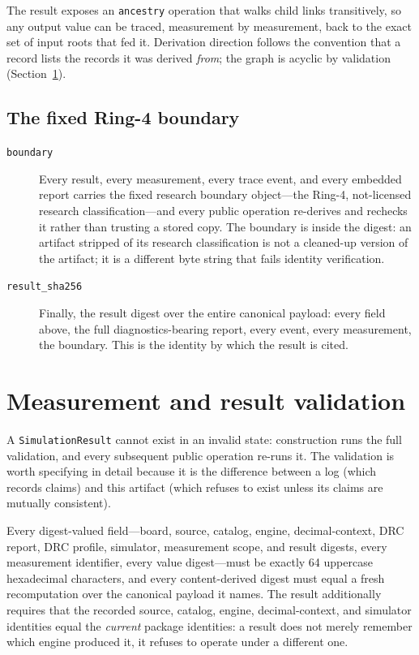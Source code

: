 The result exposes an \texttt{ancestry} operation that walks child links transitively, so any output value can be traced, measurement by measurement, back to the exact set of input roots that fed it. Derivation direction follows the convention that a record lists the records it was derived \emph{from}; the graph is acyclic by validation (Section~\ref{ch08:sec:validation}).

\subsection{The fixed Ring-4 boundary}

\begin{description}
\item[\texttt{boundary}] Every result, every measurement, every trace event, and every embedded report carries the fixed research boundary object---the Ring-4, not-licensed research classification---and every public operation re-derives and rechecks it rather than trusting a stored copy. The boundary is inside the digest: an artifact stripped of its research classification is not a cleaned-up version of the artifact; it is a different byte string that fails identity verification.
\item[\texttt{result\_sha256}] Finally, the result digest over the entire canonical payload: every field above, the full diagnostics-bearing report, every event, every measurement, the boundary. This is the identity by which the result is cited.
\end{description}

\section{Measurement and result validation}\label{ch08:sec:validation}

A \texttt{SimulationResult} cannot exist in an invalid state: construction runs the full validation, and every subsequent public operation re-runs it. The validation is worth specifying in detail because it is the difference between a log (which records claims) and this artifact (which refuses to exist unless its claims are mutually consistent).

\begin{invariant}\label{ch08:inv:digest}
Every digest-valued field---board, source, catalog, engine, decimal-context, DRC report, DRC profile, simulator, measurement scope, and result digests, every measurement identifier, every value digest---must be exactly 64 uppercase hexadecimal characters, and every content-derived digest must equal a fresh recomputation over the canonical payload it names. The result additionally requires that the recorded source, catalog, engine, decimal-context, and simulator identities equal the \emph{current} package identities: a result does not merely remember which engine produced it, it refuses to operate under a different one.
\end{invariant}

